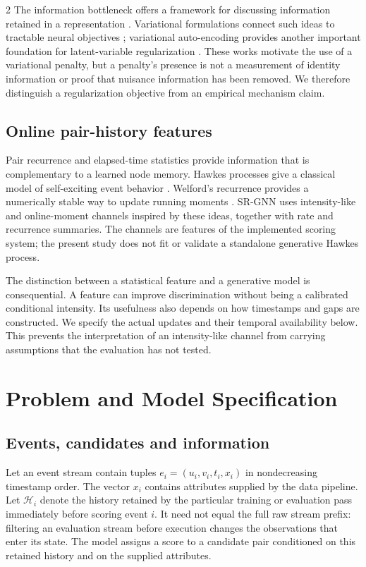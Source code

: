\documentclass[a4paper,10pt]{article}
\begin{document}
\begin{multicols}{2}
The information bottleneck offers a framework for discussing information retained in a representation \cite{tishby}. Variational formulations connect such ideas to tractable neural objectives \cite{alemi}; variational auto-encoding provides another important foundation for latent-variable regularization \cite{vae}. These works motivate the use of a variational penalty, but a penalty's presence is not a measurement of identity information or proof that nuisance information has been removed. We therefore distinguish a regularization objective from an empirical mechanism claim.

\subsection{Online pair-history features}
Pair recurrence and elapsed-time statistics provide information that is complementary to a learned node memory. Hawkes processes give a classical model of self-exciting event behavior \cite{hawkes}. Welford's recurrence provides a numerically stable way to update running moments \cite{welford}. SR-GNN uses intensity-like and online-moment channels inspired by these ideas, together with rate and recurrence summaries. The channels are features of the implemented scoring system; the present study does not fit or validate a standalone generative Hawkes process.

The distinction between a statistical feature and a generative model is consequential. A feature can improve discrimination without being a calibrated conditional intensity. Its usefulness also depends on how timestamps and gaps are constructed. We specify the actual updates and their temporal availability below. This prevents the interpretation of an intensity-like channel from carrying assumptions that the evaluation has not tested.

\section{Problem and Model Specification}
\subsection{Events, candidates and information}
Let an event stream contain tuples $e_i=(u_i,v_i,t_i,x_i)$ in nondecreasing timestamp order. The vector $x_i$ contains attributes supplied by the data pipeline. Let $\mathcal H_i$ denote the history retained by the particular training or evaluation pass immediately before scoring event $i$. It need not equal the full raw stream prefix: filtering an evaluation stream before execution changes the observations that enter its state. The model assigns a score to a candidate pair conditioned on this retained history and on the supplied attributes.


\end{multicols}
\end{document}
